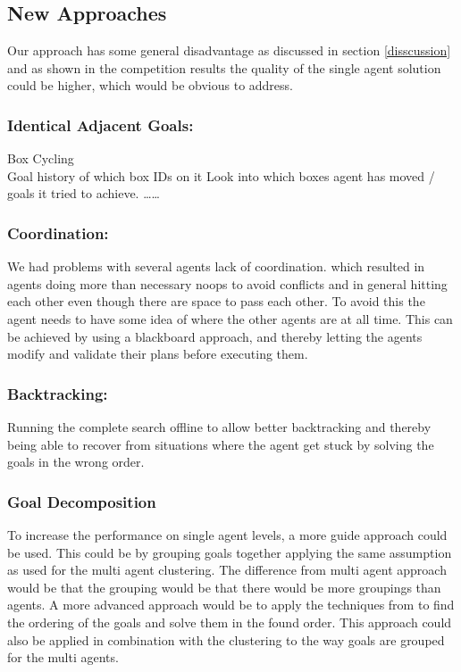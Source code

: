 \documentclass[letterpaper]{article}
\begin{document}
	\subsection{New Approaches}
		Our approach has some general disadvantage as discussed in section \ref{disscussion} and as shown in the competition results the quality of the single agent solution could be higher, which would be obvious to address.

		\subsubsection{Identical Adjacent Goals:}
			Box Cycling\\
			Goal history of which box IDs on it
			Look into which boxes agent has moved / goals it tried to achieve.
			\dots \dots
		\subsubsection{Coordination:}
			We had problems with several agents lack of coordination. which resulted in agents doing more than necessary noops to avoid conflicts and in general hitting each other even though there are space to pass each other. To avoid this the agent needs to have some idea of where the other agents are at all time. This can be achieved by using a  blackboard approach, and thereby letting the agents modify and validate their plans before executing them.
		\subsubsection{Backtracking:}
		\label{subsub:backtrack}
			Running the complete search offline to allow better backtracking and thereby being able to recover from situations where the agent get stuck by solving the goals in the wrong order. 

		\subsubsection{Goal Decomposition}
			To increase the performance on single agent levels, a more guide approach could be used. This could be by grouping goals together applying the same assumption as used for the multi agent clustering. The difference from multi agent approach would be that the grouping would be that there would be more groupings than agents. A more advanced approach would be to apply the techniques from \cite{Subgoals} to find the ordering of the goals and solve them in the found order. This approach could also be applied in combination with the clustering to the way goals are grouped for the multi agents.
			
\end{document}
